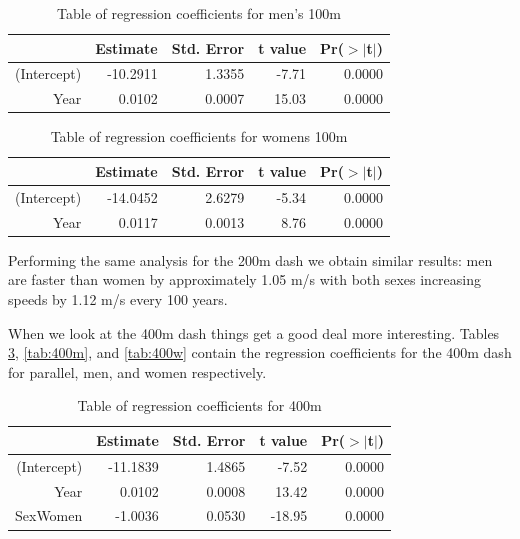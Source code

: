 \documentclass[11pt]{article}
\begin{document}
\begin{table}[ht]
\centering
\begin{tabular}{rrrrr}
  \hline
 & Estimate & Std. Error & t value & Pr($>$$|$t$|$) \\ 
  \hline
(Intercept) & -10.2911 & 1.3355 & -7.71 & 0.0000 \\ 
  Year & 0.0102 & 0.0007 & 15.03 & 0.0000 \\ 
   \hline
\end{tabular}
\caption{Table of regression coefficients for men's 100m}
\label{tab:regmen}
\end{table}

\begin{table}[ht]
\centering
\begin{tabular}{rrrrr}
  \hline
 & Estimate & Std. Error & t value & Pr($>$$|$t$|$) \\ 
  \hline
(Intercept) & -14.0452 & 2.6279 & -5.34 & 0.0000 \\ 
  Year & 0.0117 & 0.0013 & 8.76 & 0.0000 \\ 
   \hline
\end{tabular}
\caption{Table of regression coefficients for womens 100m}
\label{tab:regwom}
\end{table}

\pagebreak

Performing the same analysis for the 200m dash we obtain similar results: men are faster than women by approximately 1.05 m/s with both sexes increasing speeds by 1.12 m/s every 100 years.

When we look at the 400m dash things get a good deal more interesting. Tables \ref{tab:400b}, \ref{tab:400m}, and \ref{tab:400w} contain the regression coefficients for the 400m dash for parallel, men, and women respectively.

\begin{table}[ht]
\centering
\begin{tabular}{rrrrr}
  \hline
 & Estimate & Std. Error & t value & Pr($>$$|$t$|$) \\ 
  \hline
(Intercept) & -11.1839 & 1.4865 & -7.52 & 0.0000 \\ 
  Year & 0.0102 & 0.0008 & 13.42 & 0.0000 \\ 
  SexWomen & -1.0036 & 0.0530 & -18.95 & 0.0000 \\ 
   \hline
\end{tabular}
\caption{Table of regression coefficients for 400m}
\label{tab:400b}
\end{table}
\end{document}
